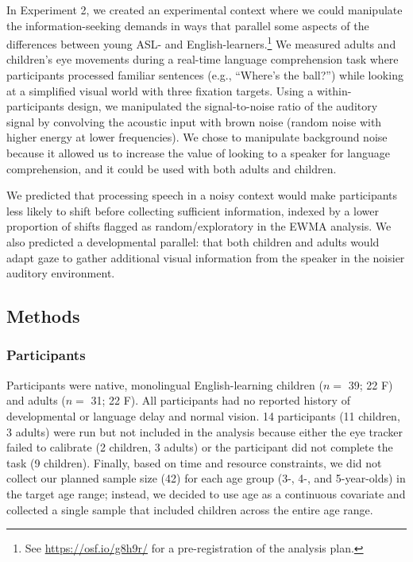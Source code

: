 \documentclass[,man,floatsintext]{apa6}
\let\rmarkdownfootnote\footnote%
\def\footnote{\protect\rmarkdownfootnote}
\begin{document}
In Experiment 2, we created an experimental context where we could
manipulate the information-seeking demands in ways that parallel some
aspects of the differences between young ASL- and
English-learners.\footnote{See \url{https://osf.io/g8h9r/} for a
  pre-registration of the analysis plan.} We measured adults and
children's eye movements during a real-time language comprehension task
where participants processed familiar sentences (e.g., \enquote{Where's
the ball?}) while looking at a simplified visual world with three
fixation targets. Using a within-participants design, we manipulated the
signal-to-noise ratio of the auditory signal by convolving the acoustic
input with brown noise (random noise with higher energy at lower
frequencies). We chose to manipulate background noise because it allowed
us to increase the value of looking to a speaker for language
comprehension, and it could be used with both adults and children.

We predicted that processing speech in a noisy context would make
participants less likely to shift before collecting sufficient
information, indexed by a lower proportion of shifts flagged as
random/exploratory in the EWMA analysis. We also predicted a
developmental parallel: that both children and adults would adapt gaze
to gather additional visual information from the speaker in the noisier
auditory environment.

\hypertarget{methods-1}{%
\subsection{Methods}\label{methods-1}}

\hypertarget{participants-1}{%
\subsubsection{Participants}\label{participants-1}}

Participants were native, monolingual English-learning children (\(n=\)
39; 22 F) and adults (\(n=\) 31; 22 F). All participants had no reported
history of developmental or language delay and normal vision. 14
participants (11 children, 3 adults) were run but not included in the
analysis because either the eye tracker failed to calibrate (2 children,
3 adults) or the participant did not complete the task (9 children).
Finally, based on time and resource constraints, we did not collect our
planned sample size (42) for each age group (3-, 4-, and 5-year-olds) in
the target age range; instead, we decided to use age as a continuous
covariate and collected a single sample that included children across
the entire age range.
\end{document}
